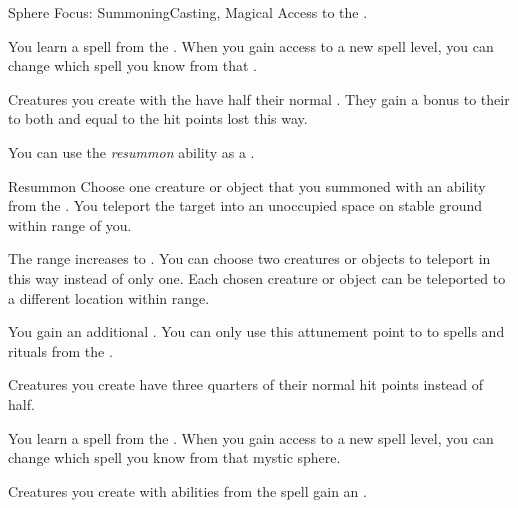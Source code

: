     \begin{feat}{Sphere Focus: Summoning}{Casting, Magical}
        \featpre Access to the  .

         You learn a spell from the  .
        When you gain access to a new spell level, you can change which spell you know from that .

         Creatures you create with the   have half their normal .
        They gain a bonus to their  to both  and  equal to the hit points lost this way.

         You can use the \textit{resummon} ability as a .
        \begin{freeability}{Resummon}
            Choose one creature or object that you summoned with an ability from the  .
            You teleport the target into an unoccupied space on stable ground within \rngmed range of you.

            \rankline
             The range increases to \rngdist.
             You can choose two creatures or objects to teleport in this way instead of only one.
                Each chosen creature or object can be teleported to a different location within range.
        \end{freeability}

         You gain an additional .
        You can only use this attunement point to  to spells and rituals from the  .

         Creatures you create have three quarters of their normal hit points instead of half.

         You learn a spell from the  .
        When you gain access to a new spell level, you can change which spell you know from that mystic sphere.

         Creatures you create with abilities from the  spell gain an .
    \end{feat}


